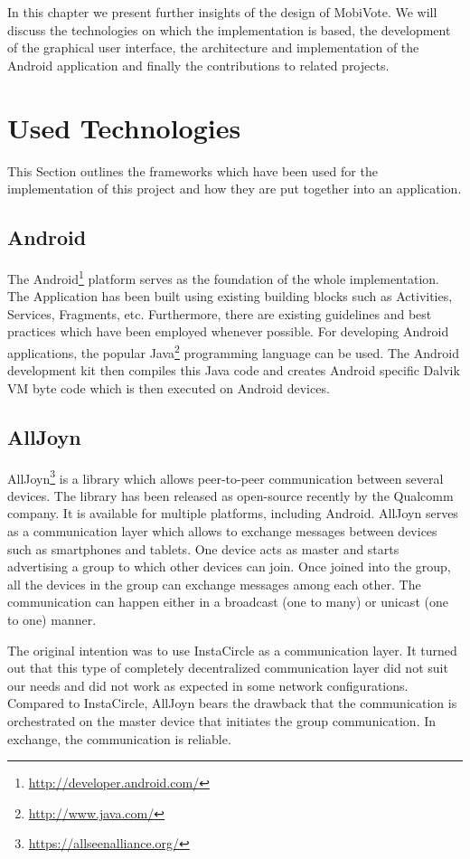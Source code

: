 \documentclass[numbers=noenddot, abstract=on, a4paper, headsepline,
footsepline, oneside, draft=off]{scrreprt}
\begin{document}
In this chapter we present further insights of the design of MobiVote. We will
discuss the technologies on which the implementation is based, the development
of the graphical user interface, the architecture and implementation of the
Android application and finally the contributions to related projects.

\section{Used Technologies}
\label{sec:usedtechnologies}
This Section outlines the frameworks which have been used for the implementation
of this project and how they are put together into an application.
\subsection{Android}
\label{sec:android}
The Android\footnote{\url{http://developer.android.com/}} platform serves as the
foundation of the whole implementation. The Application has been built using
existing building blocks such as Activities, Services, Fragments, etc.
Furthermore, there are existing guidelines and best practices which have been
employed whenever possible. For developing Android applications, the popular
Java\footnote{\url{http://www.java.com/}} programming language can be used. The
Android development kit then compiles this Java code and creates Android
specific Dalvik VM byte code which is then executed on Android devices.

\subsection{AllJoyn}
\label{sec:alljoyn}
AllJoyn\footnote{\url{https://allseenalliance.org/}} is a library which allows
peer-to-peer communication between several devices. The library has been
released as open-source recently by the Qualcomm company. It is available for
multiple platforms, including Android. AllJoyn serves as a communication layer
which allows to exchange messages between devices such as smartphones and
tablets. One device acts as master and starts advertising a group to which other
devices can join. Once joined into the group, all the devices in the group can
exchange messages among each other. The communication can happen either in a
broadcast (one to many) or unicast (one to one) manner.

The original intention was to use InstaCircle \cite{ritter13a} as a
communication layer. It turned out that this type of completely decentralized
communication layer did not suit our needs and did not work as expected in some
network configurations. Compared to InstaCircle, AllJoyn bears the drawback that
the communication is orchestrated on the master device that initiates the group
communication. In exchange, the communication is reliable.
\end{document}
